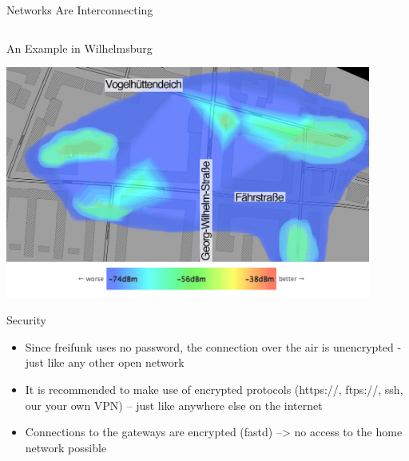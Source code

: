 \documentclass[c]{beamer}
\begin{document}
\begin{frame}{Networks Are Interconnecting}
\begin{columns}[c]
\begin{column}[r]{.5\textwidth}
{{}}
		\end{column}
	\end{columns}
\end{frame}


\begin{frame}{An Example in Wilhelmsburg}
	\begin{center}
		\includegraphics[width=0.9\textwidth]{Bilder/wilhelmsburg}
	\end{center}
\end{frame}


\begin{frame}{Security}
	\begin{itemize}
		\item Since freifunk uses no password, the connection over the air is unencrypted - just like any other open network
		\item It is recommended to make use of encrypted protocols (https://, ftps://, ssh, our your own VPN) – just like anywhere else on the internet
		\item Connections to the gateways are encrypted (fastd) --> no access to the home network possible
	\end{itemize}
\end{frame}
\end{document}
